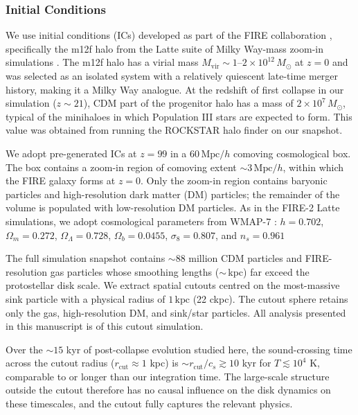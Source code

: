 \documentclass[twocolumn]{openjournal}
\newcommand{\Msun}{M_\odot}
\newcommand{\kpc}{\,\mathrm{kpc}}
\begin{document}
\subsubsection{Initial Conditions}
\label{sec:ics}

We use initial conditions (ICs) developed as part of the FIRE
collaboration \citep{FIRE_2}, specifically the m12f halo from the
Latte suite of Milky Way-mass zoom-in simulations
\citep{wetzel23}.
The m12f halo has a virial mass $M_\mathrm{vir} \sim 1$--$2 \times 10^{12}\,\Msun$
at $z = 0$ and was selected as an isolated system with a relatively
quiescent late-time merger history, making it a Milky Way analogue.
At the redshift of first collapse in our simulation ($z \sim 21$),
CDM part of the progenitor halo has a mass of $2 \times 10^{7}\,\Msun$,
typical of the minihaloes in which Population III stars are expected to form.
This value was obtained from running the ROCKSTAR halo finder
\citep{rockstar_behroozi12} on our snapshot.

We adopt pre-generated ICs at $z = 99$ in a $60\,\mathrm{Mpc}/h$ comoving
cosmological box.
The box contains a zoom-in region of comoving extent $\sim 3\,\mathrm{Mpc}/h$,
within which the FIRE galaxy forms at $z = 0$.
Only the zoom-in region contains baryonic particles and
high-resolution dark matter (DM) particles; the remainder of
the volume is populated with low-resolution DM particles.
As in the FIRE-2 Latte simulations, we adopt cosmological parameters
from WMAP-7 \citep{komatsu11}:
$h = 0.702$,
$\Omega_m = 0.272$,
$\Omega_\Lambda = 0.728$,
$\Omega_b = 0.0455$,
$\sigma_8 = 0.807$, and
$n_s = 0.961$

The full simulation snapshot contains $\sim 88$ million CDM particles
and FIRE-resolution gas particles whose smoothing lengths
($\sim$\,kpc) far exceed the protostellar disk scale.
We extract spatial cutouts centred on the most-massive sink particle
with a physical radius of $1 \kpc$ (22 ckpc).
The cutout sphere retains only the gas, high-resolution DM, and sink/star particles.
All analysis presented in this manuscript is of this cutout simulation.

Over the $\sim 15$ kyr of post-collapse evolution studied here, the
sound-crossing time across the cutout radius
($r_\mathrm{cut} \approx 1$ kpc) is
$\sim r_\mathrm{cut}/c_s \gtrsim 10$ kyr for $T \lesssim 10^4$ K,
comparable to or longer than our integration time.
The large-scale structure outside the cutout therefore has no causal
influence on the disk dynamics on these timescales, and the cutout
fully captures the relevant physics.
\end{document}
